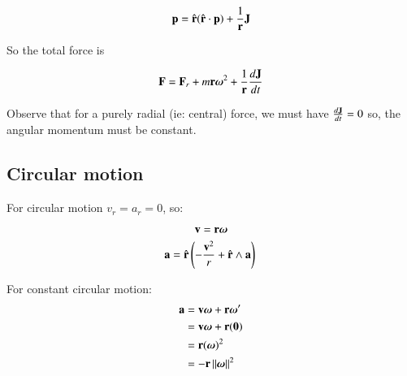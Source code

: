 \documentclass{article}      %
\newcommand{\dt}[1]{\frac{d {#1}}{dt}}
\newcommand{\Norm}[1]{\left\lVert{#1}\right\rVert}
\begin{document}
\[
\mathbf{p} = \hat{\mathbf{r}} (\hat{\mathbf{r}} \cdot \mathbf{p}) + \frac{1}{\mathbf{r}} \mathbf{J} 
\]

So the total force is

\begin{align*}
\BF 
    &= \BF_r + m \Br {\Bomega}^2 + \frac{1}{\Br}\dt{\BJ} \\
\end{align*}

Observe that for a purely radial (ie: central) force, we must have
$\dt{\BJ} = 0$
so, the angular
momentum must be constant.

%

\subsection{Circular motion}

For circular motion $v_r = a_r = 0$, so:

\[
\mathbf{v} = \mathbf{r} \boldsymbol{\omega}
\]
\[
\mathbf{a} = \hat{\mathbf{r}} \left(  -\frac{\mathbf{v}^2}{r} + \hat{\mathbf{r}} \wedge \mathbf{a} \right) \\
\]

For constant circular motion:
\begin{align*}
\Ba 
   &= \Bv\Bomega + \Br\Bomega' \\
   &= \Bv\Bomega + \Br(\Bzero) \\
   &= \Br(\Bomega)^2 \\
   &= -\Br\Norm{\Bomega}^2 \\
\end{align*}
\end{document}
